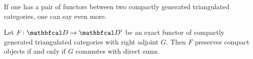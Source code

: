 
If one has a pair of functors between two compactly generated triangulated categories, one can say even more. 
\begin{proposition}
	\label{proposition: preserves compact iff right adjoint preserves coproducts}
	
	Let $F\colon \category{D} \to \category{D'}$ be an exact functor of compactly generated triangulated categories with right adjoint $G$. Then $F$ preserves compact objects if and only if $G$ commutes with direct sums.
\end{proposition}

